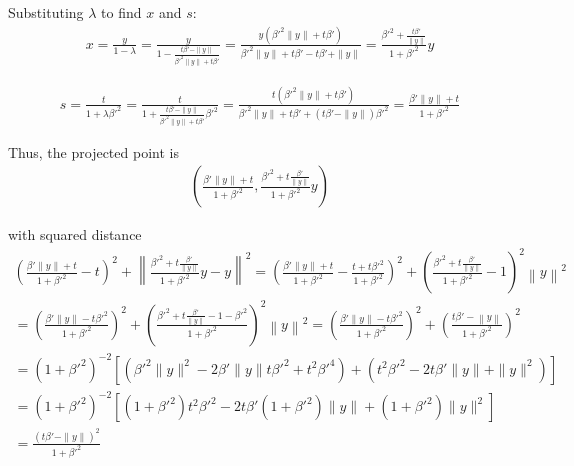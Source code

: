 \documentclass{article}
\theoremstyle{case}
\begin{document}
Substituting $\lambda$ to find $x$ and $s$:
\begin{align*}
x = \frac {y}{1 - \lambda} 																		
= \frac {y}{1 - \frac{t{\beta'} - \|y\|}{{\beta'}^2\|y\| + t{\beta'}}} 									
= \frac {y\left({\beta'}^2\|y\| + t{\beta'}\right)}{{\beta'}^2\|y\| + t{\beta'} - t{\beta'} + \|y\|} 			
= \frac {{\beta'}^2 + \frac{t{\beta'}}{\|y\|}}{1 + {\beta'}^2}y 											
\end{align*}

\begin{align*}
s = \frac {t}{1 + \lambda{\beta'}^2 } 
= \frac {t}{1 +\frac{t{\beta'} - \|y\|}{{\beta'}^2\|y\| + t{\beta'}}{\beta'}^2 } 
= \frac {t\left({\beta'}^2\|y\| + t{\beta'}\right)}{{\beta'}^2\|y\| + t{\beta'} + \left(t{\beta'} - \|y\|\right){\beta'}^2 } 
= \frac {{\beta'}\|y\| + t}{1 + {\beta'}^2 } 
\end{align*}


Thus, the projected point is
\begin{align*}
\left(\frac{{\beta'} \|y\| + t}{1 + {\beta'} ^ 2}, \frac{{\beta'} ^ 2 + t \frac {{\beta'}}{\|y\|}}{1 + {\beta'} ^ 2}y\right)
\end{align*}

with squared distance
\begin{align*}
\left(\frac{{\beta'} \|y\| + t}{1 + {\beta'} ^ 2} - t\right)^2 + \left\|\frac{{\beta'} ^ 2 + t \frac {{\beta'}}{\|y\|}}{1 + {\beta'} ^ 2}y - y\right\|^2
= \left(\frac{{\beta'} \|y\| + t}{1 + {\beta'} ^ 2} - \frac{t + t{\beta'} ^ 2}{1 + {\beta'} ^ 2}\right)^2 + \left(\frac{{\beta'} ^ 2 + t \frac {{\beta'}}{\|y\|}}{1 + {\beta'} ^ 2} - 1\right)^2\left\|y\right\|^2 \\
= \left(\frac{{\beta'} \|y\| - t{\beta'}^2}{1 + {\beta'} ^ 2}\right)^2 + \left(\frac{{\beta'} ^ 2 + t \frac {{\beta'}}{\|y\|} - 1 - {\beta'} ^ 2}{1 + {\beta'} ^ 2}\right)^2\left\|y\right\|^2 
= \left(\frac{{\beta'} \|y\| - t{\beta'}^2}{1 + {\beta'} ^ 2}\right)^2 + \left(\frac{t {\beta'} - \left\|y\right\|}{1 + {\beta'} ^ 2}\right)^2 \\
= \left(1 + {\beta'}^2\right)^{-2}\left[\left({\beta'}^2 \|y\|^2 - 2\beta' \|y\| t {\beta'}^2  + t^2 {\beta'}^4\right) + \left(t^2{\beta'}^2 - 2 t {\beta'} \|y\| + \|y\|^2\right) \right] \\
= \left(1 + {\beta'}^2\right)^{-2}\left[
\left(1 + {\beta'}^2\right)t^2{\beta'}^2 - 2t{\beta'}\left(1 + {\beta'}^2\right) \|y\| + \left(1 + {\beta'}^2\right)\|y\|^2
\right] \\
= \frac{\left(t \beta' - \|y\|\right)^2}{1 + {\beta'}^2}
\end{align*}
\end{document}
